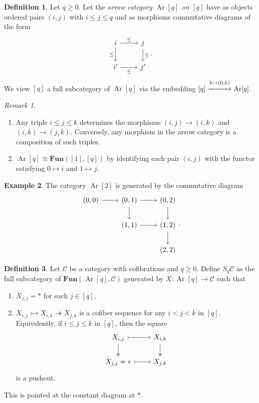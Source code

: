 \documentclass[10pt,letterpaper,cm]{nupset}
\theoremstyle{definition}
\newtheorem{definition}{Definition}
\newtheorem{exmp}[definition]{Example}
\theoremstyle{theorem}
\theoremstyle{remark}
\newtheorem{remark}{Remark}
\newcommand{\1}{\mathbf{1}}
\renewcommand{\c}{\mathscr{C}}
\newcommand{\0}{\vec 0}
\DeclareMathOperator{\Ar}{Ar}
\begin{document}
\begin{definition}
Let $q\geq 0$. Let the \textit{arrow category $\Ar[q]$ on $[q]$} have as objects ordered pairs $(i, j)$ with $i\leq j \leq q$ and as morphisms commutative diagrams of the form
\[
\begin{tikzcd}
i \arrow[d, "\leq"'] \arrow[r, "\leq"] & j \arrow[d, "\leq"] \\
i' \arrow[r, "\leq"'] & j'
\end{tikzcd}.
\] We view $[q]$ a full subcategory of $\Ar[q]$ via the embedding $[q] \overset{k \mapsto (0, k)}{\xrightarrow{\hspace*{1cm}}} \Ar[q]$.
\end{definition}

\begin{remark} $ $
\begin{enumerate}
\item Any triple $i\leq j \leq k$ determines the morphisms $(i, j) \to (i, k)$ and $(i, k) \to (j, k)$. Conversely, any morphism in the arrow category is a composition of such triples.
\item $\Ar[q] \cong \mathbf{Fun}([1], [q])$ by identifying each pair $(i, j)$ with the functor satisfying $0 \mapsto i$ and $1 \mapsto j$.
\end{enumerate}
\end{remark}

\begin{exmp}
The category $\Ar[2]$ is generated by the commutative diagram
\[
\begin{tikzcd}
{(0, 0)} \arrow[r] & {(0,1)} \arrow[r] \arrow[d] & {(0,2)} \arrow[d] \\
 & {(1, 1)} \arrow[r] & {(1,2)} \arrow[d] \\
 &  & {(2,2)}
\end{tikzcd} .
\]
\end{exmp}

\begin{definition}
Let $\c$ be a category with cofibrations and $q\geq 0$. Define $S_q\c$ as the full subcategory of $\mathbf{Fun}(\Ar[q], \c)$ generated by $X: \Ar[q] \to \c$ such that
\begin{enumerate}
\item $X_{j, j} = \ast$ for each $j \in [q]$.
\item $X_{i, j} \rightarrowtail X_{i, k} \twoheadrightarrow X_{j, k}$ is a cofiber sequence for any $i < j < k$ in $[q]$. Equivalently, if $i\leq j\leq k$ in $[q]$, then the square
\[
\begin{tikzcd}
{X_{i,j}} \arrow[d, two heads] \arrow[r, tail] & {X_{i,k}} \arrow[d, two heads] \\
{X_{j,j}=\ast} \arrow[r, tail] & {X_{j,k}}
\end{tikzcd}
\]
is a pushout. 
\end{enumerate}
This is pointed at the constant diagram at $\ast$.
\end{definition}
\end{document}
